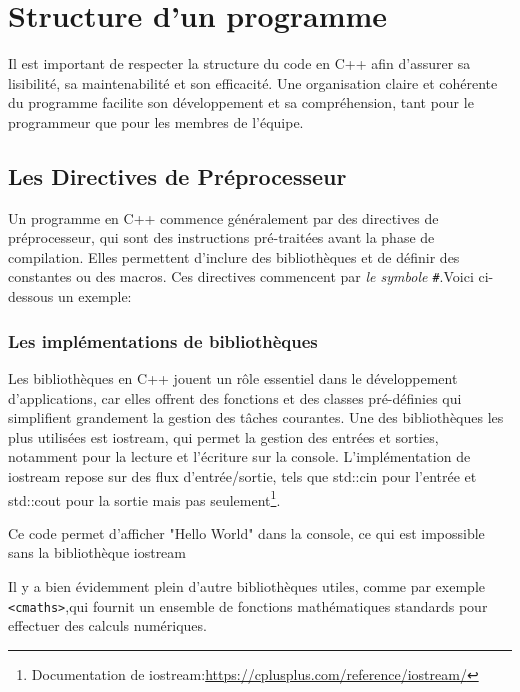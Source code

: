 \chapter{Structure d'un programme}
Il est important de respecter la structure du code en C++ afin d’assurer sa lisibilité, sa maintenabilité et son efficacité. Une organisation claire et cohérente du programme facilite son développement et sa compréhension, tant pour le programmeur que pour les membres de l’équipe.

\section{Les Directives de Préprocesseur} 
Un programme en C++ commence généralement par des directives de préprocesseur, qui sont des instructions pré-traitées avant la phase de compilation. Elles permettent d’inclure des bibliothèques et de définir des constantes ou des macros. Ces directives commencent par \emph{le symbole \lstinline|#|}.Voici ci-dessous un exemple:




\subsection{Les implémentations de bibliothèques}
Les bibliothèques en C++ jouent un rôle essentiel dans le développement d’applications, car elles offrent des fonctions et des classes pré-définies qui simplifient grandement la gestion des tâches courantes. Une des bibliothèques les plus utilisées est iostream, qui permet la gestion des entrées et sorties, notamment pour la lecture et l'écriture sur la console. L'implémentation de iostream repose sur des flux d'entrée/sortie, tels que std::cin pour l'entrée et std::cout pour la sortie mais pas seulement\footnote{Documentation de iostream:\url{https://cplusplus.com/reference/iostream/}}.



Ce code permet d'afficher "Hello World" dans la console, ce qui est impossible sans la bibliothèque iostream

Il y a bien évidemment plein d'autre bibliothèques utiles, comme par exemple \lstinline|<cmaths>|,qui fournit un ensemble de fonctions mathématiques standards pour effectuer des calculs numériques.

